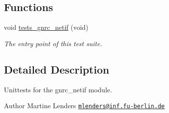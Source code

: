 \subsection*{Functions}
\begin{DoxyCompactItemize}
\item 
void \hyperlink{group__unittests_gaa2175e6139cd4093cd5668926a58e869}{tests\+\_\+gnrc\+\_\+netif} (void)
\begin{DoxyCompactList}\small\item\em The entry point of this test suite. \end{DoxyCompactList}\end{DoxyCompactItemize}


\subsection{Detailed Description}
Unittests for the {\ttfamily gnrc\+\_\+netif} module. 

\begin{DoxyAuthor}{Author}
Martine Lenders \href{mailto:mlenders@inf.fu-berlin.de}{\tt mlenders@inf.\+fu-\/berlin.\+de} 
\end{DoxyAuthor}
